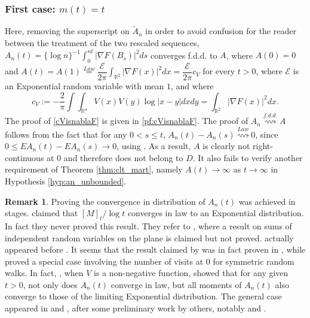 \documentclass[final]{amsart}
\theoremstyle{definition}
\newtheorem{rem}{Remark}[section]
\numberwithin{equation}{section}
\def\disp{\displaystyle}
\newcommand{\dR}{\ensuremath{\mathbb{R}}}
\newcommand{\cE}{\ensuremath{\mathcal{E}}}
\begin{document}
\subsubsection{First case: $m(t)=t$}
Here, removing the superscript on $\tilde A_n$ in order to avoid confusion for the reader
between the treatment of the two rescaled sequences,
$A_n(t) = \disp \{\log{n}\}^{-1} \int_0^{nt} |\nabla F(B_s)|^2ds$ converges f.d.d. to $A$, where $A(0)=0$ and
$A(t) =A(1) \stackrel{Law}{=} \disp \dfrac{\cE}{2\pi}\int_{\dR^2} |\nabla F(x)|^2 dx  = \dfrac{\cE}{2\pi}c_V$ for every $t>0$,
where ${\cE}$ is an Exponential random variable with mean $1$, and where
 \begin{equation}\label{cVisnablaF}
c_V := -\frac{2}{\pi}\int\int_{\dR^4} V(x)V(y)\log|x-y| dx dy = \int_{\dR^2} |\nabla F(x)|^2 dx.
\end{equation}
The proof of \eqref{cVisnablaF} is given in \ref{pf:cVisnablaF}.
The proof of $A_n \stackrel{f.d.d.}{\rightsquigarrow} A$ follows from the fact that for any $0< s \le t$,
$A_n(t)-A_n(s) \stackrel{Law}{\rightsquigarrow} 0$, since $0\le EA_n(t)-EA_n(s)\to 0$, using \cite{Darling/Kac:1957}.
As a result,  $A$ is clearly not right-continuous at $0$ and therefore does not belong to $D$.
It also fails to verify another requirement of Theorem \ref{thm:clt_mart}, namely $A(t)\to\infty$ as $t\to\infty$
in Hypothesis \ref{hyp:an_unbounded}.

\begin{rem}
Proving the convergence in distribution of $A_n(t)$ was achieved in stages. \citet{Kallianpur/Robbins:1953} claimed that $[M]_t/\log{t}$ converges in law to an Exponential distribution. In fact they never proved this result. They refer to \citet{Robbins:1953},
where a result on sums of independent random variables on the plane is claimed but not proved.
\citet{Kallianpur/Robbins:1953} actually appeared before \citet{Robbins:1953}.
It seems that the result claimed by \citet{Robbins:1953} was in fact proven in \citet{Darling/Kac:1957},
while \citet{Erdos/Taylor:1960} proved a special case involving the number of visits at $0$ for symmetric random walks.
In fact, \cite{Darling/Kac:1957},  when $V$ is a non-negative function, showed that  for any given $t>0$,
not only does $A_n(t)$ converge in law, but all moments of $A_n(t)$ also converge to those of the limiting Exponential distribution.
The general case appeared in \citet{Yamazaki:1992} and \citet[Lemma II.6 and ensuing remarks]{LeGall:1992},
after some preliminary work by others, notably \citet{Erdos/Taylor:1960} and \citet{Kasahara/Kotani:1979}.
\end{rem}
\end{document}
